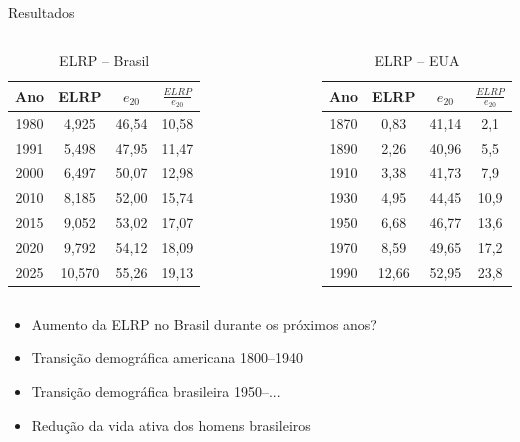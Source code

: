 \documentclass{beamer}
\begin{document}
\begin{frame}{Resultados}
	\begin{columns}[c]
	\begin{table}[!htb]
		\caption{ELRP -- Brasil}
		\begin{tabular}{cccc}
		Ano & ELRP & $e_{20}$ & $\tfrac{ELRP}{e_{20}}$ 
		\\
		\hline \hline
		1980 & 4,925 & 46,54 & 10,58                                    
		\\
		1991 & 5,498 & 47,95 & 11,47                                    
		\\
		2000 & 6,497 & 50,07 & 12,98                                   
		 \\
		2010 & 8,185 & 52,00 & 15,74                                   
		\\
		2015 & 9,052 & 53,02 & 17,07                                    
		\\
		2020 & 9,792 & 54,12 & 18,09                                    
		\\
		2025 & 10,570 & 55,26 & 19,13                                    
		\\ \hline \hline
		\end{tabular}
	\end{table}
	\begin{table}[htb]
		\caption{ELRP -- EUA}
		\label{tab3}
		\begin{tabular}{cccc}
		Ano & ELRP & $e_{20}$ & $\tfrac{ELRP}{e_{20}}$ 
		\\
		\hline \hline
		1870 & 0,83 & 41,14 & 2,1		
		\\
		1890 & 2,26 & 40,96 & 5,5		
		\\
		1910 & 3,38 & 41,73 & 7,9		
		\\
		1930 & 4,95 & 44,45 & 10,9	
		\\
		1950 & 6,68 & 46,77 & 13,6	
		\\
		1970 & 8,59 & 49,65 & 17,2	
		\\
		1990 & 12,66 & 52,95 & 23,8	
		\\ 
		\hline \hline
		\end{tabular}
	\end{table}
	\end{columns}
	\begin{itemize}
		\item{Aumento da ELRP no Brasil durante os próximos anos?}
		\item{Transição demográfica americana 1800--1940}
		\item{Transição demográfica brasileira 1950--...}
		\item{Redução da vida ativa dos homens brasileiros}
	\end{itemize}
\end{frame}
\end{document}
